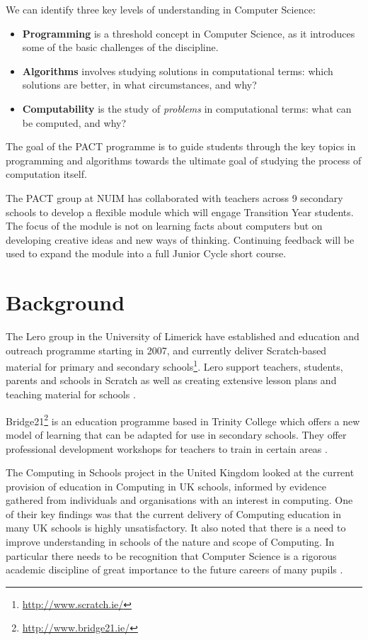 \documentclass[a4paper]{article}
\begin{document}
We can identify three key levels of understanding in Computer Science:
\begin{itemize}
\item \textbf{Programming} is a threshold concept in Computer Science, as it introduces some of the basic challenges of the discipline.  
\item \textbf{Algorithms} involves studying solutions in computational terms: which solutions are better, in what circumstances, and why?
\item \textbf{Computability} is the study of \textit{problems} in 
computational terms: what can be computed, and why?
\end{itemize}

The goal of the PACT programme is to guide students through the key topics in programming and algorithms towards the ultimate goal of studying the process of computation itself.

The PACT group at NUIM has collaborated with teachers across 9 secondary schools to develop a flexible module which will engage Transition Year students.  The focus of the module is not on learning facts about computers but on developing creative ideas and new ways of thinking.  Continuing feedback will be used to expand the module into a full Junior Cycle short course. 

\section{Background}
The Lero group in the University of Limerick have established and education and outreach programme starting in 2007, and currently deliver Scratch-based material for primary and secondary schools\footnote{\url{http://www.scratch.ie/}}. Lero support teachers, students, parents and schools in Scratch as well as creating extensive lesson plans and teaching material for schools \cite{scratch2013}.


Bridge21\footnote{\url{http://www.bridge21.ie/}} is an education programme based in Trinity College which offers a new model of learning that can be adapted for use in secondary schools. They offer professional development workshops for teachers to train in certain areas \cite{conneely13}.

The Computing in Schools project in the United Kingdom looked at the current provision of education in Computing in UK schools, informed by evidence gathered from individuals and organisations with an interest in computing. One of their key findings was that the current delivery of Computing education in many UK schools is highly unsatisfactory. It also noted that there is a need to improve understanding in schools of the nature and scope of Computing. In particular there needs to be recognition that Computer Science is a rigorous academic discipline of great importance to the future careers of many pupils \cite{compSchools}.
\end{document}
